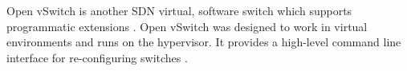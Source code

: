 Open vSwitch is another SDN virtual, software switch which supports programmatic extensions \cite{ovs_man_page, ovs2009extending, ovs2013}. Open vSwitch was designed to work in virtual environments and runs on the hypervisor. It provides a high-level command line interface for re-configuring switches \cite{ovs_man_page}.




